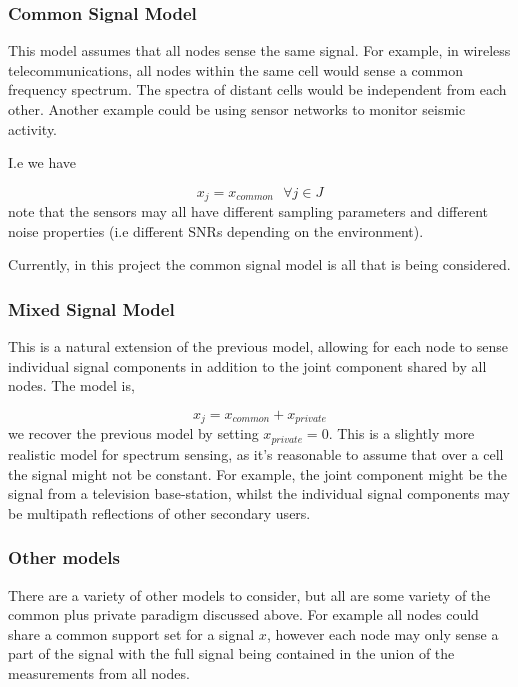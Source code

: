 \documentclass{article}
\begin{document}
\subsubsection{Common Signal Model}
This model assumes that all nodes sense the same signal. For example, in wireless telecommunications, all nodes within the same cell would sense a common frequency spectrum. The spectra of distant cells would be independent from each other. Another example could be using sensor networks to monitor seismic activity. 

I.e we have

\begin{equation}
x_j = x_{common} \text{ } \forall j \in J
\end{equation}
note that the sensors may all have different sampling parameters and different noise properties (i.e different SNRs depending on the environment). 

Currently, in this project the common signal model is all that is being considered. 

\subsubsection{Mixed Signal Model}
This is a natural extension of the previous model, allowing for each node to sense individual signal components in addition to the joint component shared by all nodes. The model is,

\begin{equation}
x_j = x_{common} + x_{private}
\end{equation}
we recover the previous model by setting \(x_{private} = 0\). This is a slightly more realistic model for spectrum sensing, as it's reasonable to assume that over a cell the signal might not be constant. For example, the joint component might be the signal from a television base-station, whilst the individual signal components may be multipath reflections of other secondary users. 

\subsubsection{Other models}
There are a variety of other models to consider, but all  are some variety of the common plus private paradigm discussed above. For example all nodes could share a common support set for a signal \(x\), however each node may only sense a part of the signal with the full signal being contained in the union of the measurements from all nodes. 
\end{document}
